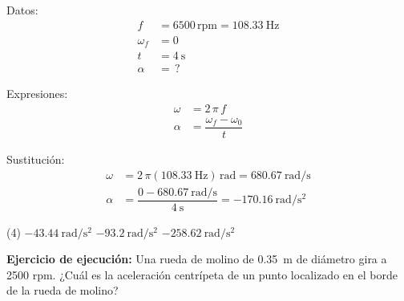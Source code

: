\documentclass[12pt, letter]{exam}
\begin{document}
\begin{questions}
    \begin{minipage}[t]{0.4\linewidth}
    Datos: 
    \begin{align*}
    f &= 6500 \, \text{rpm} = \SI{108.33}{\hertz} \\
    \omega_{f} &= 0 \\
    t &= \SI{4}{\second} \\
    \alpha &= \, ?
    \end{align*}
    \end{minipage}
    \hspace{1cm}
    \begin{minipage}[t]{0.4\linewidth}
    Expresiones:
    \begin{align*}
    \omega &= 2 \, \pi \, f \\
    \alpha &= \dfrac{\omega_{f} - \omega_{0}}{t}
    \end{align*}
    \end{minipage}

    Sustitución:
    \begin{align*}
    \omega &= 2 \, \pi (\SI{108.33}{\hertz}) \, \unit{\radian} = \SI{680.67}{\radian\per\second} \\[0.5em]
    \alpha &= \dfrac{ 0 - \SI{680.67}{\radian\per\second}}{\SI{4}{\second}} = - \SI[per-mode=fraction]{170.16}{\radian\per\square\second}
    \end{align*}

    \vspace{0.3cm}
    \begin{tasks}(4)
        \task $\displaystyle - \SI{43.44}{\radian\per\square\second}$
        \task $\displaystyle - \SI{93.2}{\radian\per\square\second}$
        \task {}
        \task $\displaystyle - \SI{258.62}{\radian\per\square\second}$
    \end{tasks}
    \question \label{Ejercicio_03} \textbf{Ejercicio de ejecución: } Una rueda de molino de \SI{0.35}{\meter} de diámetro gira a \num{2500} rpm. ¿Cuál es la aceleración centrípeta de un punto localizado en el borde de la rueda de molino?
    

\end{questions}
\end{document}
